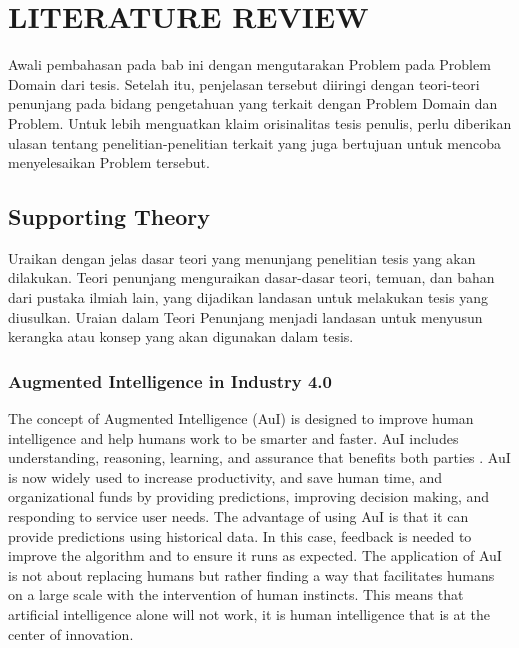 
\chapter{LITERATURE REVIEW}

\ifpdf
    \graphicspath{{Chapter2/Figs/Raster/}{Chapter2/Figs/PDF/}{Chapter2/Figs/}}
\else
    \graphicspath{{Chapter2/Figs/Vector/}{Chapter2/Figs/}}
\fi

Awali pembahasan pada bab ini dengan mengutarakan Problem pada Problem Domain dari tesis. Setelah itu, penjelasan tersebut diiringi dengan teori-teori penunjang pada bidang  pengetahuan yang terkait dengan Problem Domain dan Problem. Untuk lebih menguatkan klaim orisinalitas tesis penulis, perlu diberikan ulasan tentang penelitian-penelitian terkait yang juga bertujuan untuk mencoba menyelesaikan Problem tersebut. 

\section{Supporting Theory}
Uraikan dengan jelas dasar teori yang menunjang penelitian tesis yang akan dilakukan. Teori penunjang menguraikan dasar-dasar teori, temuan, dan bahan  dari pustaka ilmiah lain, yang dijadikan landasan untuk melakukan tesis yang diusulkan. Uraian dalam Teori Penunjang menjadi landasan untuk menyusun kerangka atau konsep yang akan digunakan dalam tesis.
\subsection{Augmented Intelligence in Industry 4.0}
The concept of Augmented Intelligence (AuI) is designed to improve human intelligence and help humans work to be smarter and faster. AuI includes understanding, reasoning, learning, and assurance that benefits both parties \cite{Wojcik2020}. AuI is now widely used to increase productivity, and save human time, and organizational funds by providing predictions, improving decision making, and responding to service user needs. The advantage of using AuI is that it can provide predictions using historical data. In this case, feedback is needed to improve the algorithm and to ensure it runs as expected. The application of AuI is not about replacing humans but rather finding a way that facilitates humans on a large scale with the intervention of human instincts. This means that artificial intelligence alone will not work, it is human intelligence that is at the center of innovation.

